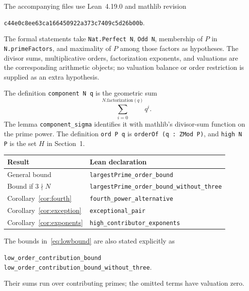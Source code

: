 \documentclass[11pt]{article}
\theoremstyle{remark}
\begin{document}
The accompanying files use Lean~4.19.0 and mathlib revision
\begin{center}\small\texttt{c44e0c8ee63ca166450922a373c7409c5d26b00b}.\end{center}
The formal statements take \texttt{Nat.Perfect N}, \texttt{Odd N}, membership of $P$ in \texttt{N.primeFactors}, and maximality of $P$ among those factors as hypotheses. The divisor sums, multiplicative orders, factorization exponents, and valuations are the corresponding arithmetic objects; no valuation balance or order restriction is supplied as an extra hypothesis.

The definition \texttt{component N q} is the geometric sum
\[
 \sum_{i=0}^{N.\mathrm{factorization}(q)}q^i.
\]
The lemma \texttt{component\_sigma} identifies it with mathlib's divisor-sum function on the prime power. The definition \texttt{ord P q} is \texttt{orderOf (q : ZMod P)}, and \texttt{high N P} is the set $H$ in Section~1.

\begin{center}
\small
\begin{tabular}{@{}p{}p{}@{}}
\toprule
Result & Lean declaration \\
\midrule
General bound & \texttt{largestPrime\_order\_bound} \\[3pt]
Bound if $3\nmid N$ & \texttt{largestPrime\_order\_bound\_without\_three} \\[3pt]
Corollary~\ref{cor:fourth} & \texttt{fourth\_power\_alternative} \\[3pt]
Corollary~\ref{cor:exception} & \texttt{exceptional\_pair} \\[3pt]
Corollary~\ref{cor:exponents} & \texttt{high\_contributor\_exponents} \\
\bottomrule
\end{tabular}
\end{center}

The bounds in~\eqref{eq:lowbound} are also stated explicitly as
\begin{center}\small
\texttt{low\_order\_contribution\_bound}\\
\texttt{low\_order\_contribution\_bound\_without\_three}.
\end{center}
Their sums run over contributing primes; the omitted terms have valuation zero.
\end{document}
